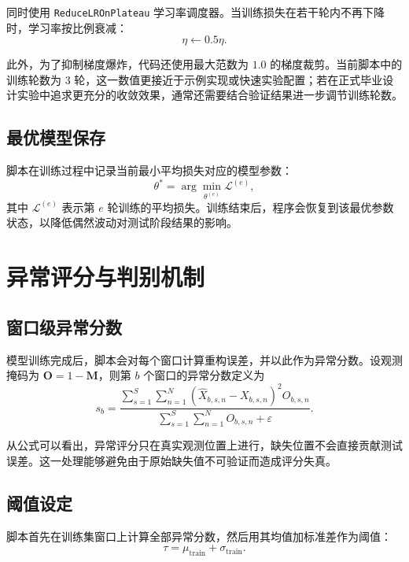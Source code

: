 同时使用 \texttt{ReduceLROnPlateau} 学习率调度器。当训练损失在若干轮内不再下降时，学习率按比例衰减：
\begin{equation}
    \eta \leftarrow 0.5 \eta.
\end{equation}

此外，为了抑制梯度爆炸，代码还使用最大范数为 $1.0$ 的梯度裁剪。当前脚本中的训练轮数为 $3$ 轮，这一数值更接近于示例实现或快速实验配置；若在正式毕业设计实验中追求更充分的收敛效果，通常还需要结合验证结果进一步调节训练轮数。

\subsection{最优模型保存}

脚本在训练过程中记录当前最小平均损失对应的模型参数：
\begin{equation}
    \theta^\ast = \arg\min_{\theta^{(e)}} \mathcal{L}^{(e)},
\end{equation}
其中 $\mathcal{L}^{(e)}$ 表示第 $e$ 轮训练的平均损失。训练结束后，程序会恢复到该最优参数状态，以降低偶然波动对测试阶段结果的影响。

\section{异常评分与判别机制}

\subsection{窗口级异常分数}

模型训练完成后，脚本会对每个窗口计算重构误差，并以此作为异常分数。设观测掩码为 $\mathbf{O}=1-\mathbf{M}$，则第 $b$ 个窗口的异常分数定义为
\begin{equation}
    s_b
    =
    \frac{
        \sum_{s=1}^{S}\sum_{n=1}^{N}
        \left(\hat{X}_{b,s,n} - X_{b,s,n}\right)^2 O_{b,s,n}
    }{
        \sum_{s=1}^{S}\sum_{n=1}^{N} O_{b,s,n} + \varepsilon
    }.
\end{equation}

从公式可以看出，异常评分只在真实观测位置上进行，缺失位置不会直接贡献测试误差。这一处理能够避免由于原始缺失值不可验证而造成评分失真。

\subsection{阈值设定}

脚本首先在训练集窗口上计算全部异常分数，然后用其均值加标准差作为阈值：
\begin{equation}
    \tau = \mu_{\mathrm{train}} + \sigma_{\mathrm{train}}.
\end{equation}

